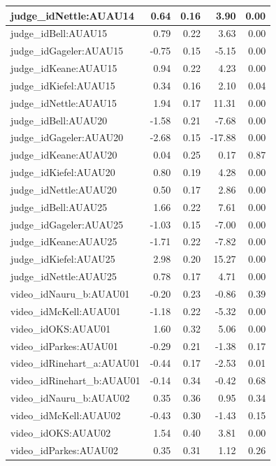 \documentclass{monashthesis}
\begin{document}
\begin{tabular}{l|r|r|r|r}
\hline
judge\_idNettle:AUAU14 & 0.64 & 0.16 & 3.90 & 0.00\\
\hline
judge\_idBell:AUAU15 & 0.79 & 0.22 & 3.63 & 0.00\\
\hline
judge\_idGageler:AUAU15 & -0.75 & 0.15 & -5.15 & 0.00\\
\hline
judge\_idKeane:AUAU15 & 0.94 & 0.22 & 4.23 & 0.00\\
\hline
judge\_idKiefel:AUAU15 & 0.34 & 0.16 & 2.10 & 0.04\\
\hline
judge\_idNettle:AUAU15 & 1.94 & 0.17 & 11.31 & 0.00\\
\hline
judge\_idBell:AUAU20 & -1.58 & 0.21 & -7.68 & 0.00\\
\hline
judge\_idGageler:AUAU20 & -2.68 & 0.15 & -17.88 & 0.00\\
\hline
judge\_idKeane:AUAU20 & 0.04 & 0.25 & 0.17 & 0.87\\
\hline
judge\_idKiefel:AUAU20 & 0.80 & 0.19 & 4.28 & 0.00\\
\hline
judge\_idNettle:AUAU20 & 0.50 & 0.17 & 2.86 & 0.00\\
\hline
judge\_idBell:AUAU25 & 1.66 & 0.22 & 7.61 & 0.00\\
\hline
judge\_idGageler:AUAU25 & -1.03 & 0.15 & -7.00 & 0.00\\
\hline
judge\_idKeane:AUAU25 & -1.71 & 0.22 & -7.82 & 0.00\\
\hline
judge\_idKiefel:AUAU25 & 2.98 & 0.20 & 15.27 & 0.00\\
\hline
judge\_idNettle:AUAU25 & 0.78 & 0.17 & 4.71 & 0.00\\
\hline
video\_idNauru\_b:AUAU01 & -0.20 & 0.23 & -0.86 & 0.39\\
\hline
video\_idMcKell:AUAU01 & -1.18 & 0.22 & -5.32 & 0.00\\
\hline
video\_idOKS:AUAU01 & 1.60 & 0.32 & 5.06 & 0.00\\
\hline
video\_idParkes:AUAU01 & -0.29 & 0.21 & -1.38 & 0.17\\
\hline
video\_idRinehart\_a:AUAU01 & -0.44 & 0.17 & -2.53 & 0.01\\
\hline
video\_idRinehart\_b:AUAU01 & -0.14 & 0.34 & -0.42 & 0.68\\
\hline
video\_idNauru\_b:AUAU02 & 0.35 & 0.36 & 0.95 & 0.34\\
\hline
video\_idMcKell:AUAU02 & -0.43 & 0.30 & -1.43 & 0.15\\
\hline
video\_idOKS:AUAU02 & 1.54 & 0.40 & 3.81 & 0.00\\
\hline
video\_idParkes:AUAU02 & 0.35 & 0.31 & 1.12 & 0.26\\

\end{tabular}
\end{document}
